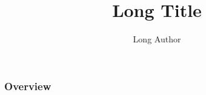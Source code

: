 \documentclass[aspectratio=169,11pt]{beamer}
\title[Short Title]{Long Title}
\author[Short author]{Long Author}
\institute[short]{long}
\begin{document}
\maketitle
{}

\begin{frame}
  \frametitle{Overview}
  \tableofcontents
\end{frame}

%
\end{document}
